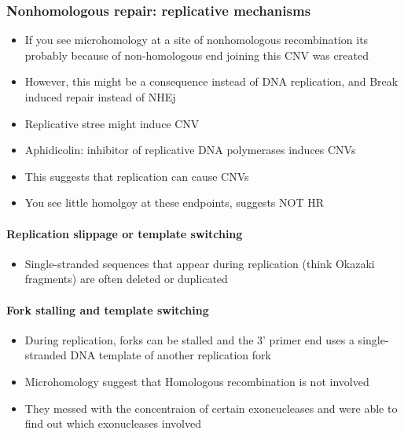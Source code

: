 \documentclass[]{book}
\providecommand{\tightlist}{%
  \setlength{\itemsep}{0pt}\setlength{\parskip}{0pt}}
\let\oldparagraph\paragraph
\renewcommand{\paragraph}[1]{\oldparagraph{#1}\mbox{}}
\begin{document}
\hypertarget{nonhomologous-repair-replicative-mechanisms}{%
\subsubsection{Nonhomologous repair: replicative mechanisms}\label{nonhomologous-repair-replicative-mechanisms}}

\begin{itemize}
\tightlist
\item
  If you see microhomology at a site of nonhomologous recombination its probably because of non-homologous end joining this CNV was created
\item
  However, this might be a consequence instead of DNA replication, and Break induced repair instead of NHEj
\item
  Replicative stree might induce CNV
\item
  Aphidicolin: inhibitor of replicative DNA polymerases induces CNVs
\item
  This suggests that replication can cause CNVs
\item
  You see little homolgoy at these endpoints, suggests NOT HR
\end{itemize}

\hypertarget{replication-slippage-or-template-switching}{%
\paragraph{Replication slippage or template switching}\label{replication-slippage-or-template-switching}}

\begin{itemize}
\tightlist
\item
  Single-stranded sequences that appear during replication (think Okazaki fragments) are often deleted or duplicated
\end{itemize}

\hypertarget{fork-stalling-and-template-switching}{%
\paragraph{Fork stalling and template switching}\label{fork-stalling-and-template-switching}}

\begin{itemize}
\tightlist
\item
  During replication, forks can be stalled and the 3' primer end uses a single-stranded DNA template of another replication fork
\item
  Microhomology suggest that Homologous recombination is not involved
\item
  They messed with the concentraion of certain exoncucleases and were able to find out which exonucleases involved
\end{itemize}
\end{document}
